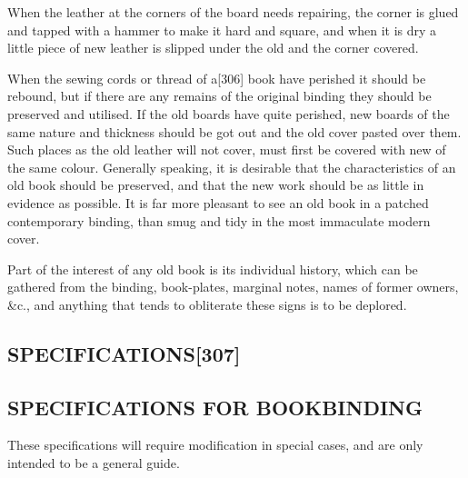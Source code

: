 \documentclass[
]{article}
\begin{document}
When the leather at the corners of the board needs repairing, the corner
is glued and tapped with a hammer to make it hard and square, and when
it is dry a little piece of new leather is slipped under the old and the
corner covered.

When the sewing cords or thread of
a{\protect\hypertarget{Page_306}{}{{[}306{]}}} book have perished it
should be rebound, but if there are any remains of the original binding
they should be preserved and utilised. If the old boards have quite
perished, new boards of the same nature and thickness should be got out
and the old cover pasted over them. Such places as the old leather will
not cover, must first be covered with new of the same colour. Generally
speaking, it is desirable that the characteristics of an old book should
be preserved, and that the new work should be as little in evidence as
possible. It is far more pleasant to see an old book in a patched
contemporary binding, than smug and tidy in the most immaculate modern
cover.

Part of the interest of any old book is its individual history, which
can be gathered from the binding, book-plates, marginal notes, names of
former owners, \&c., and anything that tends to obliterate these signs
is to be deplored.

\hypertarget{specifications307}{%
\subsection[SPECIFICATIONS]{\texorpdfstring{\protect\hypertarget{SPECIFICATIONS}{}{}SPECIFICATIONS{\protect\hypertarget{Page_307}{}{{[}307{]}}}}{SPECIFICATIONS{[}307{]}}}\label{specifications307}}

\hypertarget{specifications-for-bookbinding}{%
\subsection{SPECIFICATIONS FOR
BOOKBINDING}\label{specifications-for-bookbinding}}

These specifications will require modification in special cases, and are
only intended to be a general guide.
\end{document}
